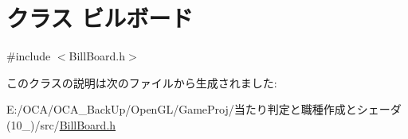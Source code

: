 \hypertarget{class_xE3_x83_x93_xE3_x83_xAB_xE3_x83_x9C_xE3_x83_xBC_xE3_x83_x89}{\section{クラス ビルボード}
\label{class_xE3_x83_x93_xE3_x83_xAB_xE3_x83_x9C_xE3_x83_xBC_xE3_x83_x89}
}


{\ttfamily \#include $<$Bill\-Board.\-h$>$}



このクラスの説明は次のファイルから生成されました\-:\begin{DoxyCompactItemize}
\item 
E\-:/\-O\-C\-A/\-O\-C\-A\-\_\-\-Back\-Up/\-Open\-G\-L/\-Game\-Proj/当たり判定と職種作成とシェーダ(10\-\_)/src/\hyperlink{_bill_board_8h}{Bill\-Board.\-h}\end{DoxyCompactItemize}
